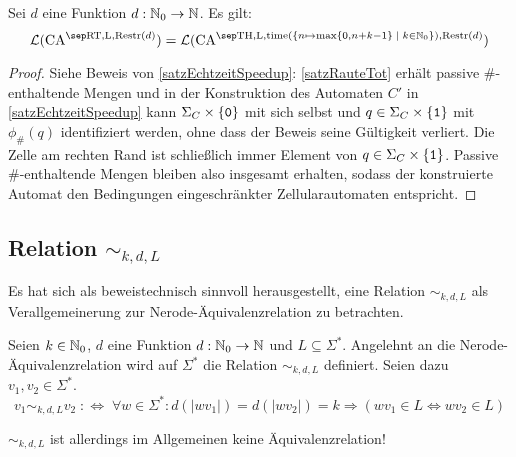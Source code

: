 \begin{satz}
    \label{satzEingeschraenktEchtzeitSpeedup}
    Sei $d$ eine Funktion $d: \mathbb{N}_0 \to \mathbb{N}$. Es gilt:
    \[
        \CAL{\CART, \CALeft, \CARestr(d)} = \CAL{\CAT, \CALeft, \mathrm{time}(\set{ n \mapsto \max \finset{0,  n + k - 1} }{ k \in \Nz }), \CARestr(d)}
    \]
\end{satz}
\begin{proof}
    Siehe Beweis von \cref{satzEchtzeitSpeedup}:
    \cref{satzRauteTot} erhält passive \#-enthaltende Mengen und 
    in der Konstruktion des Automaten $C'$ in \cref{satzEchtzeitSpeedup}
    kann $\Sigma_C \times \{ {\texttt{0}} \}$ mit sich selbst und
    $q \in \Sigma_C \times \{ {\texttt{1}} \}$ mit $\phi_{\#}(q)$ identifiziert werden, ohne dass der Beweis seine Gültigkeit verliert.
    Die Zelle am rechten Rand ist schließlich immer Element von $q \in \Sigma_C \times \{ {\texttt{1}} \}$.
    Passive \#-enthaltende Mengen bleiben also insgesamt erhalten, sodass der konstruierte Automat
    den Bedingungen eingeschränkter Zellularautomaten entspricht.
\end{proof}

\subsection{Relation \texorpdfstring{$\sim_{k,d,L}$}{sim\_kdL}}

Es hat sich als beweistechnisch sinnvoll herausgestellt, eine Relation $\sim_{k,d,L}$ als Verallgemeinerung zur Nerode-Äquivalenzrelation zu betrachten.

\begin{definition}
    Seien $k \in \mathbb{N}_0$, $d$ eine Funktion $d: \mathbb{N}_0 \to \mathbb{N}$ und $L \subseteq \Sigma^*$.
    Angelehnt an die Nerode-Äquivalenzrelation wird auf $\Sigma^*$ die Relation $\sim_{k,d,L}$ definiert.
    Seien dazu $v_1, v_2 \in \Sigma^*$.
    \[
        v_1 \sim_{k,d,L} v_2 \; :\Leftrightarrow \; \forall w \in \Sigma^*: d(|wv_1|) = d(|wv_2|) = k \Rightarrow (wv_1 \in L \Leftrightarrow wv_2 \in L)
    \]
    
    $\sim_{k,d,L}$ ist allerdings im Allgemeinen keine Äquivalenzrelation!
\end{definition}

